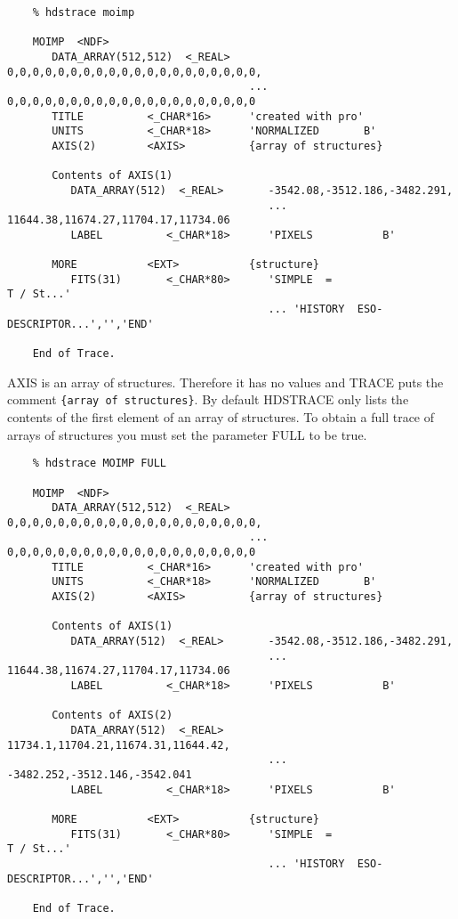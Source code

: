 \small
\begin{verbatim}
    % hdstrace moimp

    MOIMP  <NDF>
       DATA_ARRAY(512,512)  <_REAL>   0,0,0,0,0,0,0,0,0,0,0,0,0,0,0,0,0,0,0,0,
                                      ... 0,0,0,0,0,0,0,0,0,0,0,0,0,0,0,0,0,0,0,0
       TITLE          <_CHAR*16>      'created with pro'
       UNITS          <_CHAR*18>      'NORMALIZED       B'
       AXIS(2)        <AXIS>          {array of structures}

       Contents of AXIS(1)
          DATA_ARRAY(512)  <_REAL>       -3542.08,-3512.186,-3482.291,
                                         ... 11644.38,11674.27,11704.17,11734.06
          LABEL          <_CHAR*18>      'PIXELS           B'

       MORE           <EXT>           {structure}
          FITS(31)       <_CHAR*80>      'SIMPLE  =                    T / St...'
                                         ... 'HISTORY  ESO-DESCRIPTOR...','','END'
                                                                             
    End of Trace.
\end{verbatim}
\normalsize
AXIS is an array of structures.  Therefore it has no values and
{\footnotesize TRACE} puts the comment {\tt \{array of structures\}}. 
By default {\footnotesize HDSTRACE} only lists the contents of the first
element of an array of structures.  To obtain a full trace of arrays of
structures you must set the parameter FULL to be true. 

\small
\begin{verbatim}
    % hdstrace MOIMP FULL

    MOIMP  <NDF>
       DATA_ARRAY(512,512)  <_REAL>   0,0,0,0,0,0,0,0,0,0,0,0,0,0,0,0,0,0,0,0,
                                      ... 0,0,0,0,0,0,0,0,0,0,0,0,0,0,0,0,0,0,0,0
       TITLE          <_CHAR*16>      'created with pro'
       UNITS          <_CHAR*18>      'NORMALIZED       B'
       AXIS(2)        <AXIS>          {array of structures}

       Contents of AXIS(1)
          DATA_ARRAY(512)  <_REAL>       -3542.08,-3512.186,-3482.291,
                                         ... 11644.38,11674.27,11704.17,11734.06
          LABEL          <_CHAR*18>      'PIXELS           B'

       Contents of AXIS(2)
          DATA_ARRAY(512)  <_REAL>       11734.1,11704.21,11674.31,11644.42,
                                         ... -3482.252,-3512.146,-3542.041
          LABEL          <_CHAR*18>      'PIXELS           B'

       MORE           <EXT>           {structure}
          FITS(31)       <_CHAR*80>      'SIMPLE  =                    T / St...'
                                         ... 'HISTORY  ESO-DESCRIPTOR...','','END'

    End of Trace.
\end{verbatim}
\normalsize

